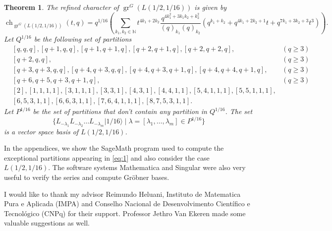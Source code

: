 \documentclass[12pt, reqno]{amsart}
\newtheorem{theorem}{Theorem}[section]
\theoremstyle{remark}
\DeclareMathOperator{\gr}{gr}
\DeclareMathOperator{\ch}{ch}
\newcommand{\vacsixteen}{|1/16\rangle}
\begin{document}
\begin{theorem}
  \label{thr:5}
  The refined character of $\gr^G(L(1/2, 1/16))$ is given by
  \begin{equation*}
    \ch_{\gr^G(L(1/2, 1/16))}(t, q) = q^{1/16}\left(\sum_{k_1, k_2 \in \mathbb{N}}t^{4k_1 + 2k_2}\frac{q^{4k_1^2 + 3k_1k_2 + k_2^2}}{(q)_{k_1}(q)_{k_2}}(q^{k_1 + k_2} + q^{4k_1 + 2k_2 + 1}t + q^{7k_1 + 3k_2 + 3}t^3)\right).
  \end{equation*}
  Let $Q^{1/16}$ be the following set of partitions
  \begin{equation}
    \label{eq:2}
    \begin{aligned}
    &[q, q, q], [q + 1, q, q], [q + 1, q + 1, q], [q + 2, q + 1, q], [q + 2, q + 2, q], &(q \ge 3) \\
    &[q + 2, q, q], &(q \ge 3) \\
    &[q + 3, q + 3, q, q], [q + 4, q + 3, q, q],  [q + 4, q + 3, q + 1, q], [q + 4, q + 4, q + 1, q], &(q \ge 3)\\
    &[q + 6, q + 5, q + 3, q + 1, q], &(q \ge 3) \\
    &[2], [1, 1, 1, 1], [3, 1, 1, 1], [3, 3, 1], [4, 3, 1], [4, 4, 1, 1], [5, 4, 1, 1, 1], [5, 5, 1, 1, 1], \\
    &[6, 5, 3, 1, 1], [6, 6, 3, 1, 1], [7, 6, 4, 1, 1, 1], [8, 7, 5, 3, 1, 1].
    \end{aligned}
  \end{equation}
  Let $P^{1/16}$ be the set of partitions that don't contain any partition in $Q^{1/16}$.
  The set
  \begin{equation*}
    \{L_{-\lambda_1}L_{-\lambda_2}\dots L_{-\lambda_m}\vacsixteen \mid \lambda = [\lambda_1, \dots, \lambda_m] \in P^{1/16}\}
  \end{equation*}
  is a vector space basis of $L(1/2, 1/16)$.
\end{theorem}

In the appendices, we show the SageMath \cite{sagemath} program used to compute the exceptional partitions appearing in \eqref{eq:1} and also consider the case $L(1/2, 1/16)$.
The software systems Mathematica \cite{Mathematica} and Singular \cite{Singular} were also very useful to verify the series and compute Gr\"{o}bner bases.

I would like to thank my advisor Reimundo Heluani, Instituto de Matematica Pura e Aplicada (IMPA) and Conselho Nacional de Desenvolvimento Científico e Tecnológico (CNPq) for their support.
Professor Jethro Van Ekeren made some valuable suggestions as well.
\end{document}
